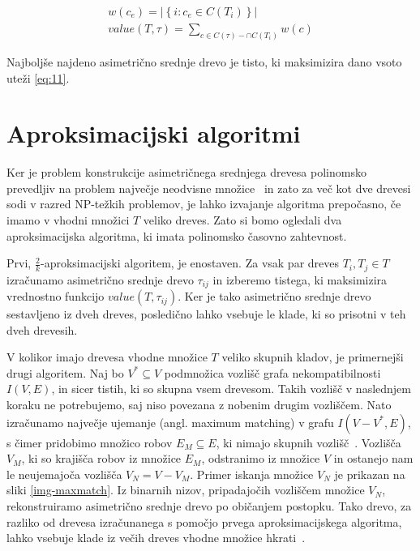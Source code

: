 \documentclass[a4paper, 12pt]{book}
\begin{document}
\begin{align}
	w(c_e) = \left| \left\{ i: c_e \in C(T_i) \right\} \right| \label{eq:10} \\
	value(T, \tau) = \sum_{c \in C(\tau) - \cap C(T_i)} w(c) \label{eq:11}
\end{align}

Najboljše najdeno asimetrično srednje drevo je tisto, ki maksimizira dano vsoto uteži \ref{eq:11}.

\section{Aproksimacijski algoritmi}
Ker je problem konstrukcije asimetričnega srednjega drevesa polinomsko prevedljiv na problem največje neodvisne množice~\cite{pw} in zato za več kot dve drevesi sodi v razred NP-težkih problemov, je lahko izvajanje algoritma prepočasno, če imamo v vhodni množici $T$ veliko dreves. Zato si bomo ogledali dva aproksimacijska algoritma, ki imata polinomsko časovno zahtevnost.

Prvi, $\frac{2}{k}$-aproksimacijski algoritem, je enostaven. Za vsak par dreves $T_i, T_j \in T$ izračunamo asimetrično srednje drevo $\tau_{ij}$ in izberemo tistega, ki maksimizira vrednostno funkcijo $value(T, \tau_{ij})$. Ker je tako asimetrično srednje drevo sestavljeno iz dveh dreves, posledično lahko vsebuje le klade, ki so prisotni v teh dveh drevesih.

V kolikor imajo drevesa vhodne množice $T$ veliko skupnih kladov, je primernejši drugi algoritem. Naj bo $V^* \subseteq V$ podmnožica vozlišč grafa nekompatibilnosti $I(V, E)$, in sicer tistih, ki so skupna vsem drevesom. Takih vozlišč v naslednjem koraku ne potrebujemo, saj niso povezana z nobenim drugim vozliščem. Nato izračunamo največje ujemanje (angl. maximum matching) v grafu $I(V - V^*, E)$, s čimer pridobimo množico robov $E_{M} \subseteq E$, ki nimajo skupnih vozlišč~\cite{mgt}. Vozlišča $V_{M}$, ki so krajišča robov iz množice $E_{M}$, odstranimo iz množice $V$ in ostanejo nam le neujemajoča vozlišča $V_{N} = V - V_{M}$. Primer iskanja množice $V_N$ je prikazan na sliki \ref{img-maxmatch}. Iz binarnih nizov, pripadajočih vozliščem množice $V_{N}$, rekonstruiramo asimetrično srednje drevo po običanjem postopku. Tako drevo, za razliko od drevesa izračunanega s pomočjo prvega aproksimacijskega algoritma, lahko vsebuje klade iz večih dreves vhodne množice hkrati~\cite{pw}. 
\end{document}

